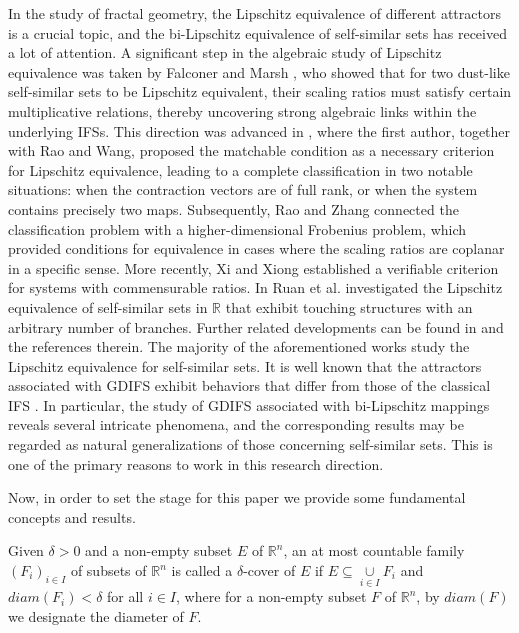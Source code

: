 \documentclass[a4paper,12pt,reqno]{amsart}
\numberwithin{equation}{section}
\theoremstyle{definition}
\theoremstyle{remark}
\numberwithin{equation}{section}
\begin{document}
In the study of fractal geometry, the Lipschitz equivalence of different attractors is a crucial topic, and the bi-Lipschitz equivalence of self-similar sets has received a lot of attention. A significant step in the algebraic study of Lipschitz equivalence was taken by Falconer and Marsh \cite{FM}, who showed that for two dust-like self-similar sets to be Lipschitz equivalent, their scaling ratios must satisfy certain multiplicative relations, thereby uncovering strong algebraic links within the underlying IFSs. This direction was advanced in \cite{Rao}, where the first author, together with Rao and Wang, proposed the matchable condition as a necessary criterion for Lipschitz equivalence, leading to a complete classification in two notable situations: when the contraction vectors are of full rank, or when the system contains precisely two maps. Subsequently, Rao and Zhang \cite{Rao2} connected the classification problem with a higher-dimensional Frobenius problem, which provided conditions for equivalence in cases where the scaling ratios are coplanar in a specific sense. More recently, Xi and Xiong \cite{Xi} established a verifiable criterion for systems with commensurable ratios.
In \cite{HJR} Ruan et al. investigated the Lipschitz equivalence of self-similar sets in $\mathbb{R}$ that exhibit touching structures with an arbitrary number of branches. 
Further related developments can be found in \cite{JJ, ML, RAO, LF, YX} and the references therein.
The majority of the aforementioned works study the Lipschitz equivalence for self-similar sets. 
It is well known that the attractors associated with GDIFS exhibit behaviors that differ from those of the classical IFS \cite{BF, FHZ}. In particular, the study of GDIFS associated with bi-Lipschitz mappings reveals several intricate phenomena, and the corresponding results may be regarded as natural generalizations of those concerning self-similar sets. This is one of the primary reasons to work in this research direction.

Now, in order to set the stage for this paper we provide some fundamental concepts and results.
\par
 Given $\delta >0$ and a non-empty subset $E$ of $\mathbb{R}^{n}$, an at most
countable family $(F_{i})_{i\in I}$ of subsets of $\mathbb{R}^{n}$ is called
a $\delta $-cover of $E$ if $E\subseteq \underset{i\in I}{\cup }F_{i}$ and $%
diam(F_{i})<\delta $ for all $i\in I$, where for a non-empty subset $F$ of $%
\mathbb{R}^{n}$, by $diam(F)$ we designate the diameter of $F$.
\end{document}
